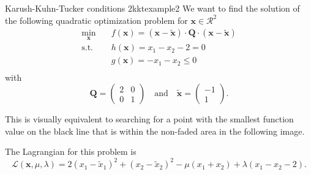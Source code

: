 \begin{example}{Karush-Kuhn-Tucker conditions 2}{kktexample2}
    We want to find the solution of the following quadratic optimization problem for $\mathbf{x} \in \mathcal{R}^2$
    \begin{equation}
        \begin{aligned}
            \min_{\mathbf{x}} \quad & f(\mathbf{x})= (\mathbf{x}-\tilde{\mathbf{x}}) \cdot \mathbf{Q} \cdot (\mathbf{x}-\tilde{\mathbf{x}})\\
            \textrm{s.t.} \quad     & h(\mathbf{x}) = x_1 - x_2 - 2 = 0  \\
                          \quad     & g(\mathbf{x}) = -x_1 - x_2 \le 0  \\
        \end{aligned}
    \end{equation}
    with 
    \begin{equation}
        \mathbf{Q} = 
        \begin{pmatrix}
        2 & 0 \\
        0 & 1 
        \end{pmatrix} 
        \quad 
        \text{and}
        \quad
        \tilde{\mathbf{x}} = 
        \begin{pmatrix}
        -1\\
        1 
        \end{pmatrix}.
    \end{equation}

    This is visually equivalent to searching for a point with the smallest function value on the black line that is within the non-faded area in the following image.
    \begin{center}
        
    \end{center}

    The Lagrangian for this problem is 
    \begin{equation}
        \mathcal{L}(\mathbf{x}, \mu, \lambda) = 2 (x_1-\tilde{x}_1)^2 + (x_2-\tilde{x}_2)^2 - \mu (x_1+x_2) + \lambda (x_1 - x_2 -2).
    \end{equation}


\end{example}

